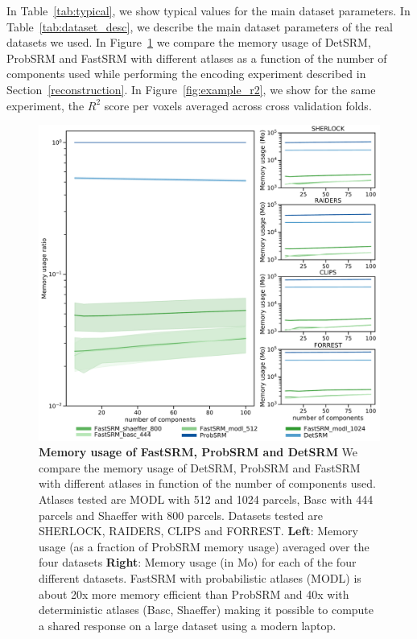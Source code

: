 In Table~\ref{tab:typical}, we show typical values for the main dataset parameters. In Table~\ref{tab:dataset_desc}, we describe the main dataset parameters of the real datasets we used. In Figure~\ref{fig:memory_usage} we compare the memory usage of DetSRM, ProbSRM and FastSRM with different atlases as a function of the number of components used while performing the encoding experiment described in Section~\ref{reconstruction}. In Figure~\ref{fig:example_r2}, we show for the same experiment, the $R^2$ score per voxels averaged across cross validation folds. 


\begin{figure}
\centering
\includegraphics[scale=0.33]{figures/srm/memory_usage.pdf}
\caption{\textbf{Memory usage of FastSRM, ProbSRM and DetSRM} We compare the memory usage of DetSRM, ProbSRM and FastSRM with different atlases in function of the number of components used. Atlases tested are MODL with 512 and 1024 parcels, Basc with 444 parcels and Shaeffer with 800 parcels. Datasets tested are SHERLOCK, RAIDERS, CLIPS and FORREST.
\textbf{Left}: Memory usage (as a fraction of ProbSRM memory usage) averaged over the four datasets
\textbf{Right}: Memory usage (in Mo) for each of the four different datasets.
FastSRM with probabilistic atlases (MODL) is about 20x more memory efficient than ProbSRM and 40x with deterministic atlases (Basc, Shaeffer) making it possible to compute a shared response on a large dataset using a modern laptop.}
\label{fig:memory_usage}
\end{figure}



